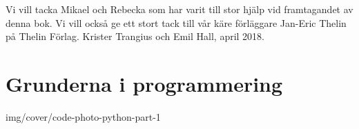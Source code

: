 \documentclass[14pt]{extbook}
\begin{document}
Vi vill tacka Mikael och Rebecka som har varit till stor hjälp vid framtagandet av denna bok. Vi vill också ge ett stort tack till vår käre förläggare Jan-Eric Thelin på Thelin Förlag.
\newline
\newline
Krister Trangius och Emil Hall, april 2018.

\newpage
{}
\renewcommand{\thechapter}{\Alph{chapter}}%

\setcounter{page}{1}
\tableofcontents %


\pagestyle{fancy} %





\thispagestyle{plain} %
\part{Grunderna i programmering}{img/cover/code-photo-python-part-1}

\mainmatter
\renewcommand{\thechapter}{\arabic{chapter}}%
\setcounter{chapter}{0}%

\pagestyle{fancy} %
\end{document}
